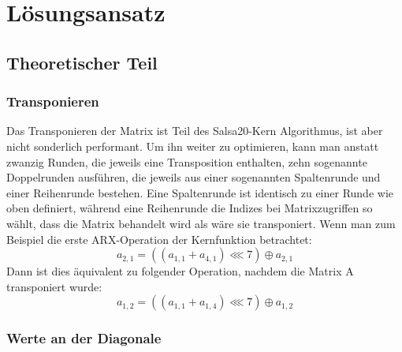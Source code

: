 \documentclass[course=erap]{aspdoc}
\begin{document}
\section{Lösungsansatz}
\subsection{Theoretischer Teil}
\subsubsection{Transponieren}

Das Transponieren der Matrix ist Teil des Salsa20-Kern Algorithmus, ist aber nicht sonderlich performant.
Um ihn weiter zu optimieren, kann man anstatt zwanzig Runden, die jeweils eine Transposition enthalten, zehn sogenannte Doppelrunden
ausführen, die jeweils aus einer sogenannten Spaltenrunde und einer Reihenrunde bestehen. Eine Spaltenrunde ist identisch zu einer
Runde wie oben definiert, während eine Reihenrunde die Indizes bei Matrixzugriffen so wählt, dass die Matrix behandelt wird
als wäre sie transponiert.
Wenn man zum Beispiel die erste ARX-Operation der Kernfunktion betrachtet:
\[
    a_{2,1} = ((a_{1,1} + a_{4,1}) \lll 7) \oplus a_{2,1} 
\]
Dann ist dies äquivalent zu folgender Operation, nachdem die Matrix A transponiert wurde:
\[
    a_{1,2} = ((a_{1,1} + a_{1,4}) \lll 7) \oplus a_{1,2}
\]

\subsubsection{Werte an der Diagonale}
\end{document}
